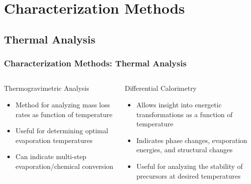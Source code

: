 \documentclass[professionalfont]{beamer}
\begin{document}

\section{Characterization Methods}

\subsection{Thermal Analysis}
\begin{frame}
	\vspace{-0.5cm}
	\frametitle{Characterization Methods: Thermal Analysis}
	\begin{columns}[t]
			\begin{block}{Thermogravimetric Analysis}
				\begin{itemize}
					\item Method for analyzing mass loss rates as function of temperature
					\item Useful for determining optimal evaporation temperatures
					\item Can indicate multi-step evaporation/chemical conversion
				\end{itemize}
			\end{block}
			\begin{block}{Differential Calorimetry}
				\begin{itemize}
					\item Allows insight into energetic transformations as a function of temperature
					\item Indicates phase changes, evaporation energies, and structural changes
					\item Useful for analyzing the stability of precursors at desired temperatures
				\end{itemize}
			\end{block}
	\end{columns}
\end{frame}
\end{document}

